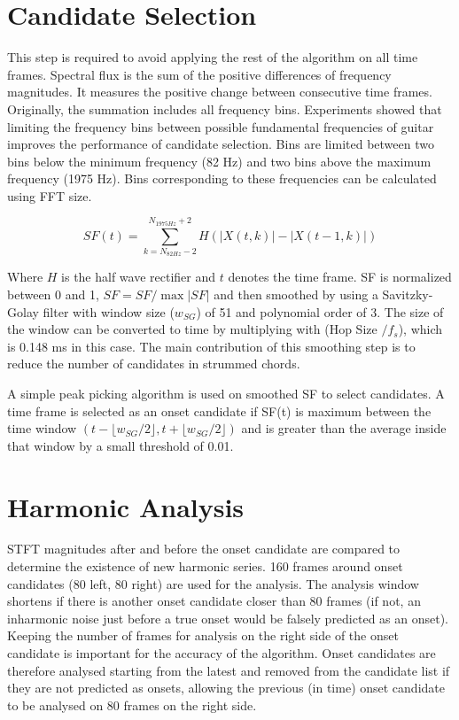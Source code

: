 \section{Candidate Selection}

This step is required to avoid applying the rest of the algorithm on all time frames. Spectral flux \cite{spectralflux} is the sum of the positive differences of frequency magnitudes. It measures the positive change between consecutive time frames. Originally, the summation includes all frequency bins. Experiments showed that limiting the frequency bins between possible fundamental frequencies of guitar improves the performance of candidate selection. Bins are limited between two bins below the minimum frequency (82 Hz) and two bins above the maximum frequency (1975 Hz). Bins corresponding to these frequencies can be calculated using FFT size.

\begin{equation}\label{SF}
    SF(t) = \sum_{k=N_{82Hz}-2}^{N_{1975Hz}+2} H(|X(t,k)|-|X(t-1,k)|)
\end{equation}

Where $H$ is the half wave rectifier and $t$ denotes the time frame. SF is normalized between 0 and 1, \( SF = SF / \max |SF|\)  and then smoothed by using a Savitzky-Golay filter \cite{savgol} with window size (\(w_{SG}\)) of 51 and polynomial order of 3. The size of the window can be converted to time by multiplying with (Hop Size \(/ f_s\)), which is 0.148 ms in this case. The main contribution of this smoothing step is to reduce the number of candidates in strummed chords.

A simple peak picking algorithm is used on smoothed SF to select candidates. A time frame is selected as an onset candidate if SF(t) is maximum between the time window \((t-\lfloor w_{SG}/2\rfloor, t+\lfloor w_{SG}/2\rfloor) \) and is greater than the average inside that window by a small threshold of 0.01.  

\section{Harmonic Analysis}

STFT magnitudes after and before the onset candidate are compared to determine the existence of new harmonic series. 160 frames around onset candidates (80 left, 80 right) are used for the analysis. The analysis window shortens if there is another onset candidate closer than 80 frames (if not, an inharmonic noise just before a true onset would be falsely predicted as an onset).  Keeping the number of frames for analysis on the right side of the onset candidate is important for the accuracy of the algorithm. Onset candidates are therefore analysed starting from the latest and removed from the candidate list if they are not predicted as onsets, allowing the previous (in time) onset candidate to be analysed on 80 frames on the right side.

